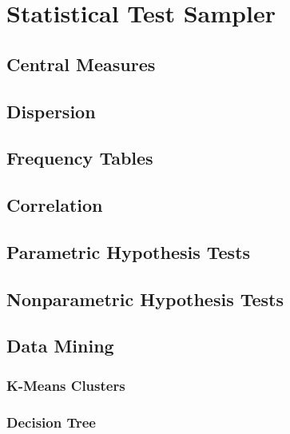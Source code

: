 \section{Statistical Test Sampler}

\subsection{Central Measures}

\subsection{Dispersion}

\subsection{Frequency Tables}

\subsection{Correlation}

\subsection{Parametric Hypothesis Tests}

\subsection{Nonparametric Hypothesis Tests}

\subsection{Data Mining}

\subsubsection{K-Means Clusters}

\subsubsection{Decision Tree}

